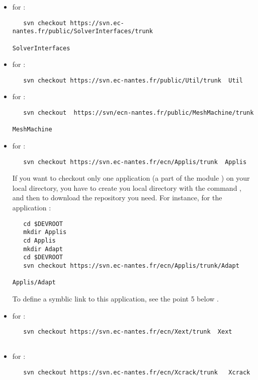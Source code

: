 \begin{enumerate}
\begin{itemize}
	\item for :
        \begin{verbatim}
   svn checkout https://svn.ec-nantes.fr/public/SolverInterfaces/trunk  
	                                                       SolverInterfaces
        \end{verbatim}          	
	\item for :
        \begin{verbatim}
   svn checkout https://svn.ec-nantes.fr/public/Util/trunk  Util
        \end{verbatim}        
	\item for :
        \begin{verbatim}
   svn checkout  https://svn/ecn-nantes.fr/public/MeshMachine/trunk   
                                                            MeshMachine
        \end{verbatim}     	
	
	\item for :
        \begin{verbatim}
   svn checkout https://svn.ec-nantes.fr/ecn/Applis/trunk  Applis
        \end{verbatim}	If you want to checkout only one application (a part of the module ) on your local directory, you have to create you local directory with the command , and then to download the repository you need.  For instance, for the application  :
        \begin{verbatim}
   cd $DEVROOT
   mkdir Applis
   cd Applis
   mkdir Adapt
   cd $DEVROOT
   svn checkout https://svn.ec-nantes.fr/ecn/Applis/trunk/Adapt 
                                                            Applis/Adapt
        \end{verbatim} To define a symblic link to this application, see the point 5 below .\\
	
	
		
        \item for :
        \begin{verbatim}
   svn checkout https://svn.ec-nantes.fr/ecn/Xext/trunk  Xext   
       
        \end{verbatim} 

        \item for :
        \begin{verbatim}
   svn checkout https://svn.ec-nantes.fr/ecn/Xcrack/trunk   Xcrack    
    

\end{verbatim}
\end{itemize}
\end{enumerate}

